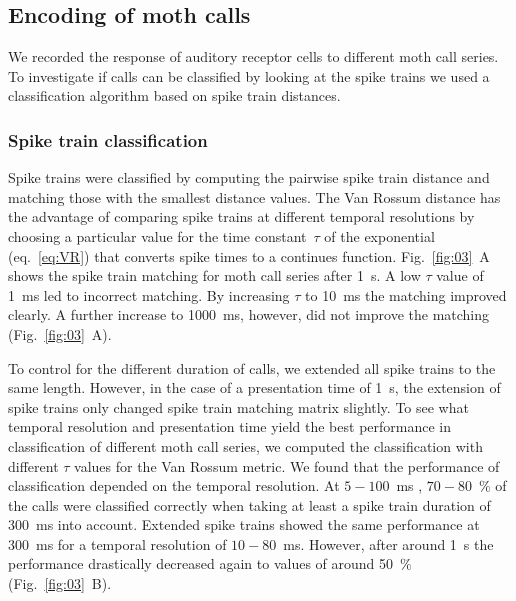 \documentclass[12pt,a4paper]{article}
\newcommand{\fig}[2]{(Fig.~#1~#2)}
\newcommand{\percent}[1]{#1~$\%$}
\begin{document}
\subsection{Encoding of moth calls}
\label{mothcalls}
We recorded the response of auditory receptor cells to different moth call series. To investigate if calls can be classified by looking at the spike trains we used a classification algorithm based on spike train distances.
\subsubsection{Spike train classification}
Spike trains were classified by computing the pairwise spike train distance and matching those with the smallest distance values. The Van Rossum distance has the advantage of comparing spike trains at different temporal resolutions by choosing a particular value for the time constant~$\tau$ of the exponential (eq.~\ref{eq:VR}) that converts spike times to a continues function. Fig.~\ref{fig:03}~A shows the spike train matching for moth call series after 1~s. A low $\tau$ value of 1~ms led to incorrect matching. By increasing $\tau$ to 10~ms the matching improved clearly. A further increase to 1000~ms, however, did not improve the matching \fig{\ref{fig:03}}{A}. 

To control for the different duration of calls, we extended all spike trains to the same length.
However, in the case of a presentation time of 1~s, the extension of spike trains only changed spike train matching matrix slightly.
To see what temporal resolution and presentation time yield the best performance in classification of different moth call series, we computed the classification with different $ \tau $ values for the Van Rossum metric. We found that the performance of classification depended on the temporal resolution. At $5-100$~ms , \percent{$70-80$} of the calls were classified correctly when taking at least a spike train duration of 300~ms into account. Extended spike trains showed the same performance at 300~ms for a temporal resolution of $10-80$~ms. However, after around 1~s the performance drastically decreased again to values of around \percent{50} \fig{\ref{fig:03}}{B}. 
\end{document}
